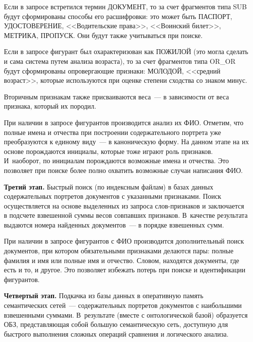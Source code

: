 \begin{multicols}{2}
    Если в запросе встретился термин ДОКУМЕНТ, то за счет фрагментов 
типа SUB будут сформированы способы его расшифровки: это может быть 
ПАСПОРТ, УДОСТОВЕРЕНИЕ, <<Водительские права>>, <<Воинский 
билет>>, МЕТРИКА, ПРОПУСК. Они будут также учитываться при поиске.
    
    Если в запросе фигурант был охарактеризован как ПОЖИЛОЙ (это могла 
сделать и сама система путем анализа возраста), то за счет фрагментов типа 
OR\_OR будут сформированы опровергающие признаки: МОЛОДОЙ, 
<<средний возраст>>, которые используются при оценке степени сходства со 
знаком минус.
    
    Вторичным признакам также присваиваются веса~--- в зависимости от веса 
признака, который их породил.
    
    При наличии в запросе фигурантов производится анализ их ФИО. 
Отметим, что полные имена и отчества при построении содержательного 
портрета уже преобразуются к единому виду~--- в каноническую форму. На 
данном этапе на их основе порождаются инициалы, которые тоже играют роль 
признаков. И~наоборот, по инициалам порождаются возможные имена и 
отчества. Это позволяет при поиске более полно охватить возможные случаи 
написания ФИО.
    
    \textbf{Третий этап.} Быстрый поиск (по индексным файлам) в базах 
данных содержательных портретов документов с указанными признаками. 
Поиск осуществляется на основе выделенных из запроса слов-признаков и 
заключается в подсчете взвешенной суммы весов совпавших признаков. 
В~качестве результата выдаются номера найденных документов~--- в порядке 
взвешенных сумм.
    
    При наличии в запросе фигурантов с ФИО производится дополнительный 
поиск документов, при котором обязательными признаками делаются пары: 
полные фамилия и имя или полные имя и отчество. Словом, находятся 
документы, где есть и то, и другое. Это позволяет избежать потерь при поиске и 
идентификации фигурантов.
    
    \textbf{Четвертый этап.} Подкачка из базы данных в оперативную память 
семантических сетей~--- содержательных портретов документов с 
наибольшими взвешенными суммами. В~результате (вместе с онтологической 
базой) образуется ОБЗ, представляющая собой 
большую семантическую сеть, доступную для быстрого выполнения сложных 
операций сравнения и логического анализа.
    

\end{multicols}
